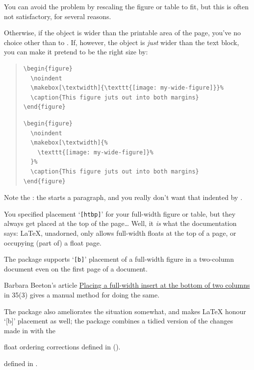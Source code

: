 You can avoid the problem by rescaling the figure or table to fit, but
this is often not satisfactory, for several reasons.

Otherwise, if the object is wider than the printable area of the page,
you've no choice other than to .  If,
however, the object is \emph{just} wider than the text block, you can
make it pretend to be the right size by:
\begin{quote}
\begin{wideversion}
\begin{verbatim}
\begin{figure}
  \noindent
  \makebox[\textwidth]{\texttt{[image: my-wide-figure]}}%
  \caption{This figure juts out into both margins}
\end{figure}
\end{verbatim}
\end{wideversion}
\begin{narrowversion}
\begin{verbatim}
\begin{figure}
  \noindent
  \makebox[\textwidth]{%
    \texttt{[image: my-wide-figure]}%
  }%
  \caption{This figure juts out into both margins}
\end{figure}
\end{verbatim}
\end{narrowversion}
\end{quote}
Note the : the  starts a paragraph, and you
really don't want that indented by .


You specified placement `\texttt{[htbp]}' for your full-width figure or
table, but they always get placed at the top of the page\dots{}  Well,
it \emph{is} what the documentation says: \LaTeX{}, unadorned, only
allows full-width floats at the top of a page, or occupying (part of) a
float page.

The package  supports `\texttt{[b]}' placement of a
full-width figure in a two-column document even on the first page of a
document.

Barbara Beeton's article
\href{http://tug.org/TUGboat/tb35-3/tb111beet-banner.pdf}{Placing a
full-width insert at the bottom of two columns} in \TUGboat{} 35(3)
gives a manual method for doing the same.

The  package also ameliorates the situation somewhat, and
makes \LaTeX{} honour `[b]' placement as well; the
 package combines a tidied version of the changes
made in  with the
\begin{narrowversion} %
  float ordering corrections defined in 
  ().
\end{narrowversion}
\begin{wideversion} %
   defined in
  .
\end{wideversion}

